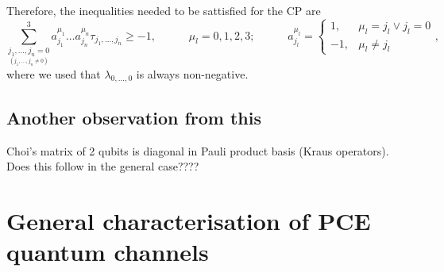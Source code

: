 \documentclass[11pt,dvipsnames]{article} %
\newcommand{\1}{\mathds{1}}
\begin{document}
Therefore, the inequalities needed to be sattisfied for the CP are
\begin{equation}\label{eq:eigvals-PCE}
\sum_{\underset{(j_1,\ldots,j_n\neq0)}{j_1,\ldots,j_n=0}}^3
a_{j_1}^{\mu_1}\ldots a_{j_n}^{\mu_n}\tau_{j_1,\ldots,j_n}
\geq
-1,
\hspace{35pt}
\mu_l=0,1,2,3;
\hspace{35pt}
a_{j_l}^{\mu_l}=\left\{ \begin{array}{rl}
             1, & \mu_l=j_l \lor j_l=0\\
             -1, & \mu_l\neq j_l
             \end{array}
   \right.,
\end{equation}
where we used that $\lambda_{0,\ldots,0}$ is always non-negative.
\subsection*{Another observation from this} %
Choi's matrix of 2 qubits is diagonal in Pauli product basis
(Kraus operators). Does this follow in the general case???? 
\section*{General characterisation of PCE quantum channels} %
\end{document}

